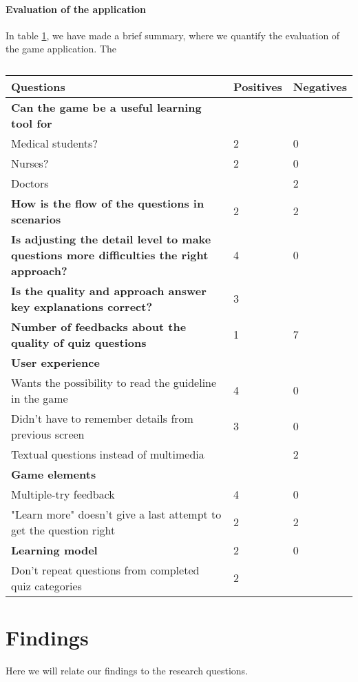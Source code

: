 \paragraph{Evaluation of the application}
In table \ref{table:AppEvaluation}, we have made a brief summary, where we quantify the evaluation of the game application. The  
\begin{table}[h!]
	\begin{tabular}{ | m{18em} | m{4em}| m{4em} | } 
		\hline
		\textbf{Questions} & \textbf{Positives} & \textbf{Negatives}\\
		\hline
		\textbf{Can the game be a useful learning tool for} &  &  \\
		Medical students? & 2 & 0 \\
		Nurses? & 2 & 0 \\
		Doctors & & 2 \\
		\hline
		\textbf{How is the flow of the questions in scenarios} & 2 & 2 \\
		\hline
		\textbf{Is adjusting the detail level to make questions more difficulties the right approach?} & 4 & 0 \\
		\hline
		\textbf{Is the quality and approach answer key explanations correct?} & 3 & \\
		\hline
		\textbf{Number of feedbacks about the quality of quiz questions} & 1 & 7 \\
		\textbf{User experience} & & \\
		Wants the possibility to read the guideline in the game & 4 & 0  \\
		Didn't have to remember details from previous screen & 3 & 0 \\
		Textual questions instead of multimedia & & 2 \\
		\hline
		\textbf{Game elements} & & \\
		Multiple-try feedback & 4 & 0 \\
		"Learn more" doesn't give a last attempt to get the question right & 2 & 2 \\
		\hline
		\textbf{Learning model} & 2 & 0 \\
		Don't repeat questions from completed quiz categories & 2 & \\
		\hline
	\end{tabular}
	\caption{}
	\label{table:AppEvaluation}
\end{table}

\section{Findings}
Here we will relate our findings to the research questions.

